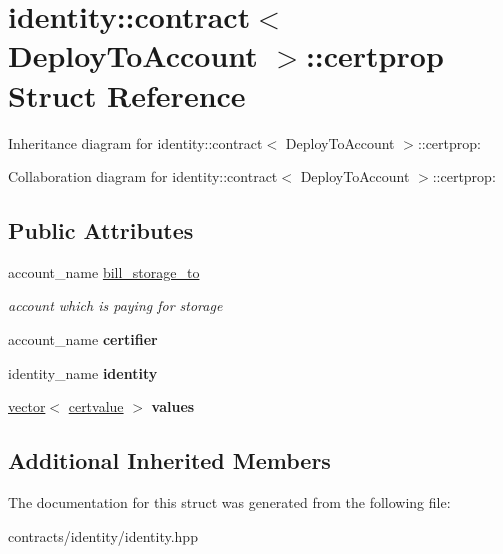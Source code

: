 \hypertarget{structidentity_1_1contract_1_1certprop}{}\section{identity\+:\+:contract$<$ Deploy\+To\+Account $>$\+:\+:certprop Struct Reference}
\label{structidentity_1_1contract_1_1certprop}


Inheritance diagram for identity\+:\+:contract$<$ Deploy\+To\+Account $>$\+:\+:certprop\+:


Collaboration diagram for identity\+:\+:contract$<$ Deploy\+To\+Account $>$\+:\+:certprop\+:
\subsection*{Public Attributes}
\begin{DoxyCompactItemize}
\item 
\mbox{\label{structidentity_1_1contract_1_1certprop_a3ec530c0d82dc3b635c7d709ac07113f}} 
account\+\_\+name \mbox{\hyperlink{structidentity_1_1contract_1_1certprop_a3ec530c0d82dc3b635c7d709ac07113f}{bill\+\_\+storage\+\_\+to}}
\begin{DoxyCompactList}\small\item\em account which is paying for storage \end{DoxyCompactList}\item 
\mbox{\label{structidentity_1_1contract_1_1certprop_a6e55f9ba29ede0ec9ac1b9e442430d9f}} 
account\+\_\+name {\bfseries certifier}
\item 
\mbox{\label{structidentity_1_1contract_1_1certprop_a5ec3738256a7ae0b992089134429ddd9}} 
identity\+\_\+name {\bfseries identity}
\item 
\mbox{\label{structidentity_1_1contract_1_1certprop_a5af3185aee3f3c8864e16f956ccba270}} 
\mbox{\hyperlink{classstd_1_1vector}{vector}}$<$ \mbox{\hyperlink{structidentity_1_1contract_1_1certvalue}{certvalue}} $>$ {\bfseries values}
\end{DoxyCompactItemize}
\subsection*{Additional Inherited Members}


The documentation for this struct was generated from the following file\+:\begin{DoxyCompactItemize}
\item 
contracts/identity/identity.\+hpp\end{DoxyCompactItemize}
